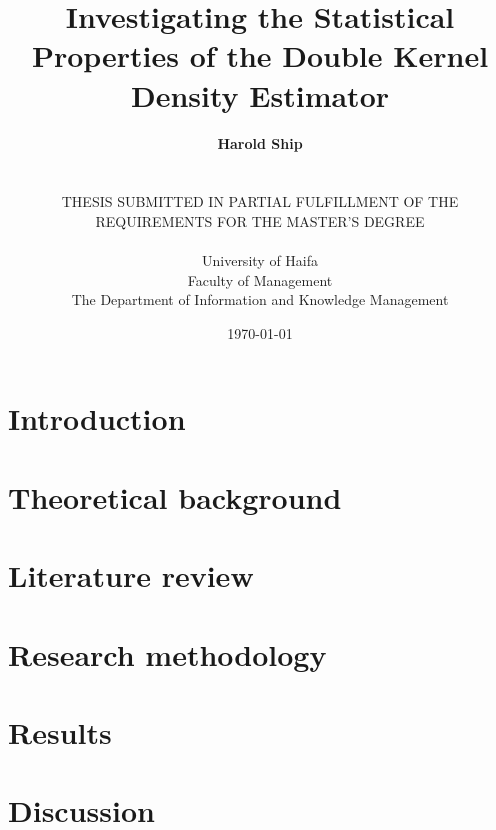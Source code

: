 \documentclass[a4paper,12pt,titlepage,twoside,openany]{book}
\title{
    \textbf{Investigating the Statistical Properties of the Double Kernel Density Estimator}
}
\author{
    \textbf{Harold Ship}\\%
    \\%
    \\%
    THESIS SUBMITTED IN PARTIAL FULFILLMENT OF THE\\%
    REQUIREMENTS FOR THE MASTER'S DEGREE\\%
    \\%
    University of Haifa\\%
    Faculty of Management\\%
    The Department of Information and Knowledge Management
}
\date{\printdayoff\today}
\begin{document}
\lstset{language=R}

\frontmatter                            %
\doublespacing
\maketitle                              %

\cleardoublepage


\cleardoublepage

\singlespacing                          %
\tableofcontents                        %
\cleardoublepage


\cleardoublepage

\listoftables
\cleardoublepage
\listoffigures
\printglossaries


\mainmatter                             %

\onehalfspacing
\chapter{Introduction}
\label{ch:introduction}


\chapter{Theoretical background}
\label{ch:theory}


\chapter{Literature review}
\label{ch:literature}


\chapter{Research methodology}
\label{ch:method}


\chapter{Results}
\label{ch:results}


\chapter{Discussion}
\label{ch:discussion}

\end{document}
